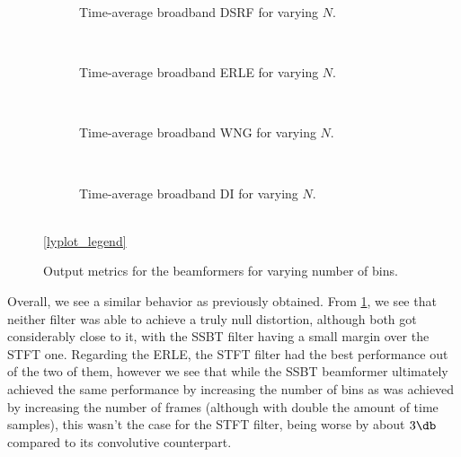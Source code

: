 
\begin{figure}[!t]
	\centering
	\begin{subfigure}{\textwidth}
		\centering
		
		\caption{Time-average broadband DSRF for varying $N$.}
		\label{subfig:lineplot__DSRF__N_var__iSER_n15}
	\end{subfigure}\\[1em]
	\begin{subfigure}{\textwidth}
		\centering
		
		\caption{Time-average broadband ERLE for varying $N$.}
		\label{subfig:lineplot__ERLE__N_var__iSER_n15}
	\end{subfigure}\\[1em]
	\begin{subfigure}{\textwidth}
		\centering
		
		\caption{Time-average broadband WNG for varying $N$.}
		\label{subfig:lineplot__WNG__N_var__iSER_n15}
	\end{subfigure}\\[1em]
	\begin{subfigure}{\textwidth}
		\centering
		
		\caption{Time-average broadband DI for varying $N$.}
		\label{subfig:lineplot__DI__N_var__iSER_n15}
	\end{subfigure}\\[1em]
	\ref*{lyplot_legend}
	\caption{Output metrics for the beamformers for varying number of bins.}
	\label{fig:lineplot__N_var__iSER_n15__Ly_1__err_0}
\end{figure}

Overall, we see a similar behavior as previously obtained. From \cref{subfig:lineplot__DSRF__N_var__iSER_n15}, we see that neither filter was able to achieve a truly null distortion, although both got considerably close to it, with the SSBT filter having a small margin over the STFT one. Regarding the ERLE, the STFT filter had the best performance out of the two of them, however we see that while the SSBT beamformer ultimately achieved the same performance by increasing the number of bins as was achieved by increasing the number of frames (although with double the amount of time samples), this wasn't the case for the STFT filter, being worse by about $3\dB$ compared to its convolutive counterpart.

